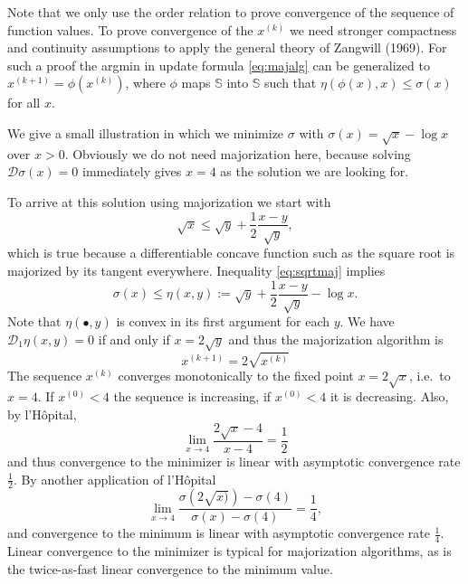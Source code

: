 \documentclass[
  12pt,
]{article}
\begin{document}
Note that we only use the order relation to prove convergence of the sequence of
function values. To prove convergence of the \(x^{(k)}\) we need stronger
compactness and continuity assumptions to apply the general theory of
Zangwill (1969). For such a proof the argmin in update formula \eqref{eq:majalg} can be generalized to \(x^{(k+1)}=\phi(x^{(k)})\), where \(\phi\) maps \(\mathbb{S}\) into \(\mathbb{S}\) such that \(\eta(\phi(x),x)\leq\sigma(x)\) for all \(x\).

We give a small illustration in which we minimize \(\sigma\) with \(\sigma(x)=\sqrt{x}-\log{x}\)
over \(x>0\). Obviously we do not need majorization here, because solving \(\mathcal{D}\sigma(x)=0\) immediately gives \(x=4\) as the solution we are looking for.

To arrive at this solution using majorization we start with
\begin{equation}
\sqrt{x}\leq\sqrt{y}+\frac12\frac{x-y}{\sqrt{y}},
\label{eq:sqrtmaj}
\end{equation}
which is true because a differentiable concave function such as the square root is majorized by its tangent everywhere.
Inequality \eqref{eq:sqrtmaj} implies
\begin{equation}
\sigma(x)\leq\eta(x,y):=\sqrt{y}+\frac12\frac{x-y}{\sqrt{y}}-\log{x}.
\label{eq:examplemaj}
\end{equation}
Note that \(\eta(\bullet,y)\) is convex in its first argument for each \(y\).
We have \(\mathcal{D}_1\eta(x,y)=0\) if and only if \(x=2\sqrt{y}\) and thus the majorization algorithm is
\begin{equation}
x^{(k+1)}=2\sqrt{x^{(k)}}
\label{eq:examplealg}
\end{equation}
The sequence \(x^{(k)}\) converges monotonically to the fixed point \(x=2\sqrt{x}\), i.e.~to \(x=4\). If \(x^{(0)}<4\) the sequence is increasing, if \(x^{(0)}<4\) it is decreasing. Also, by l'Hôpital,
\begin{equation}
\lim_{x\rightarrow 4}\frac{2\sqrt{x}-4}{x-4}=\frac12
\label{eq:hopi1}
\end{equation}
and thus convergence to the minimizer is linear with asymptotic convergence rate \(\frac12\). By another application of l'Hôpital
\begin{equation}
\lim_{x\rightarrow 4}\frac{\sigma(2\sqrt{x)})-\sigma(4)}{\sigma(x)-\sigma(4)}=\frac14,
\label{eq:hopi2}
\end{equation}
and convergence to the minimum is linear with asymptotic convergence rate \(\frac14\).
Linear convergence to the minimizer is typical for majorization algorithms, as is
the twice-as-fast linear convergence to the minimum value.
\end{document}
